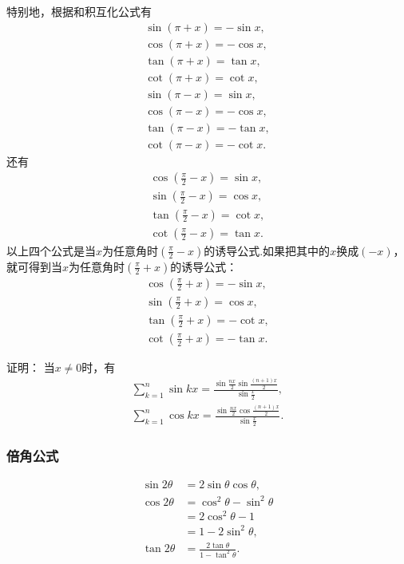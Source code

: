 特别地，根据和积互化公式有
\begin{gather}
	\sin(\pi+x) = -\sin x, \\
	\cos(\pi+x) = -\cos x, \\
	\tan(\pi+x) = \tan x, \\
	\cot(\pi+x) = \cot x, \\
	\sin(\pi-x) = \sin x, \\
	\cos(\pi-x) = -\cos x, \\
	\tan(\pi-x) = -\tan x, \\
	\cot(\pi-x) = -\cot x.
\end{gather}
还有
\begin{gather}
	\cos\left(\frac{\pi}{2}-x\right) = \sin x, \\
	\sin\left(\frac{\pi}{2}-x\right) = \cos x, \\
	\tan\left(\frac{\pi}{2}-x\right) = \cot x, \\
	\cot\left(\frac{\pi}{2}-x\right) = \tan x.
\end{gather}
以上四个公式是当\(x\)为任意角时\(\left(\frac{\pi}{2}-x\right)\)的诱导公式.如果把其中的\(x\)换成\((-x)\)，就可得到当\(x\)为任意角时\(\left(\frac{\pi}{2}+x\right)\)的诱导公式：
\begin{gather}
	\cos\left(\frac{\pi}{2}+x\right) = -\sin x, \\
	\sin\left(\frac{\pi}{2}+x\right) = \cos x, \\
	\tan\left(\frac{\pi}{2}+x\right) = -\cot x, \\
	\cot\left(\frac{\pi}{2}+x\right) = -\tan x.
\end{gather}

\begin{example}
\def\s{\sum\limits_{k=1}^n}%
证明：
当\(x\neq0\)时，有
\begin{gather}
	\s \sin kx
	= \frac{\sin\frac{nx}{2} \sin\frac{(n+1)x}{2}}{\sin\frac{x}{2}}, \\
	\s \cos kx
	= \frac{\sin\frac{nx}{2} \cos\frac{(n+1)x}{2}}{\sin\frac{x}{2}}.
\end{gather}
\end{example}

\subsubsection{倍角公式}
\begin{theorem}[二倍角公式]
\begin{align}
	\sin 2 \theta &= 2 \sin \theta \cos \theta, \\
	\cos 2 \theta &= \cos^2 \theta - \sin^2 \theta \\
		&= 2 \cos^2 \theta - 1 \\
		&= 1 - 2 \sin^2 \theta, \\
	\tan 2 \theta &= \frac{2 \tan \theta}{1 - \tan^2 \theta}.
\end{align}
\end{theorem}

